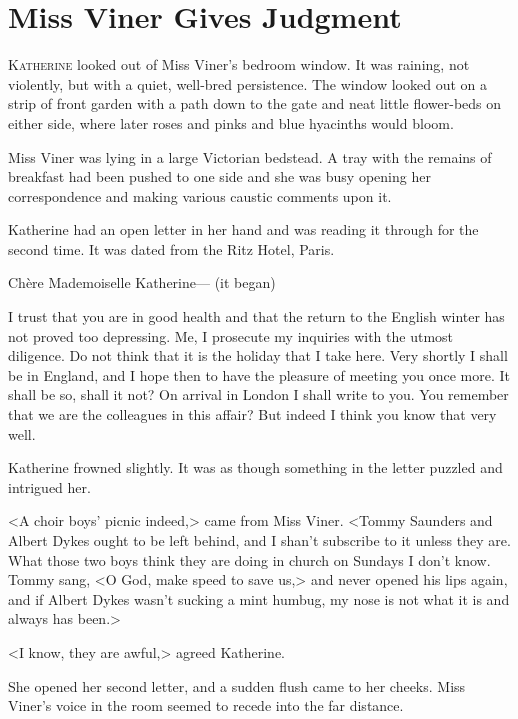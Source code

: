 \chapter{Miss Viner Gives Judgment}



\lettrine{K}{atherine} looked out of Miss Viner's bedroom window. It was raining, not violently, but with a quiet, well-bred persistence. The window looked out on a strip of front garden with a path down to the gate and neat little flower-beds on either side, where later roses and pinks and blue hyacinths would bloom.

Miss Viner was lying in a large Victorian bedstead. A tray with the remains of breakfast had been pushed to one side and she was busy opening her correspondence and making various caustic comments upon it.

Katherine had an open letter in her hand and was reading it through for the second time. It was dated from the Ritz Hotel, Paris.

\begin{mail}{}{Chère Mademoiselle Katherine--- (it began)}

	I trust that you are in good health and that the return to the English winter has not proved too depressing. Me, I prosecute my inquiries with the utmost diligence. Do not think that it is the holiday that I take here. Very shortly I shall be in England, and I hope then to have the pleasure of meeting you once more. It shall be so, shall it not? On arrival in London I shall write to you. You remember that we are the colleagues in this affair? But indeed I think you know that very well.

\end{mail}

Katherine frowned slightly. It was as though something in the letter puzzled and intrigued her.

<A choir boys' picnic indeed,> came from Miss Viner. <Tommy Saunders and Albert Dykes ought to be left behind, and I shan't subscribe to it unless they are. What those two boys think they are doing in church on Sundays I don't know. Tommy sang, <O God, make speed to save us,> and never opened his lips again, and if Albert Dykes wasn't sucking a mint humbug, my nose is not what it is and always has been.>

<I know, they are awful,> agreed Katherine.

She opened her second letter, and a sudden flush came to her cheeks. Miss Viner's voice in the room seemed to recede into the far distance.

